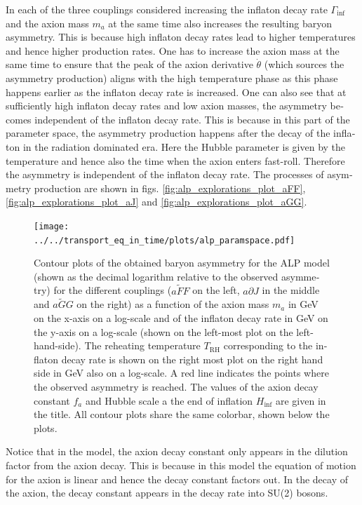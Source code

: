 \documentclass[master,       %
               twoside,        %
               BCOR10mm,       %
               english,ngerman, %
               ]{GAUBM}
\begin{document}
\begin{otherlanguage}{english}
In each of the three couplings considered increasing the inflaton decay rate $\Gamma_\mathrm{inf}$ and the axion mass $m_a$ at the same time also increases the resulting baryon asymmetry. This is because high inflaton decay rates lead to higher temperatures and hence higher production rates. One has to increase the axion mass at the same time to ensure that the peak of the axion derivative $\dot{\theta}$ (which sources the asymmetry production) aligns with the high temperature phase as this phase happens earlier as the inflaton decay rate is increased. One can also see that at sufficiently high inflaton decay rates and low axion masses, the asymmetry becomes independent of the inflaton decay rate. This is because in this part of the parameter space, the asymmetry production happens after the decay of the inflaton in the radiation dominated era. Here the Hubble parameter is given by the temperature and hence also the time when the axion enters fast-roll. Therefore the asymmetry is independent of the inflaton decay rate.
The processes of asymmetry production are shown in figs. \ref{fig:alp_explorations_plot_aFF},  \ref{fig:alp_explorations_plot_aJ} and \ref{fig:alp_explorations_plot_aGG}.
\begin{figure}[H]
    \texttt{[image: ../../transport\_eq\_in\_time/plots/alp\_paramspace.pdf]}
    \caption{Contour plots of the obtained baryon asymmetry  for the ALP model (shown as the decimal logarithm relative to the observed asymmetry) for the different couplings ($a\tilde{F}F$ on the left, $a\partial J$ in the middle and $a \tilde{G} G$ on the right) as a function of the axion mass $m_a$ in GeV on the x-axis on a log-scale and of the inflaton decay rate in GeV on the y-axis on a log-scale (shown on the left-most plot on the left-hand-side). The reheating temperature $T_\mathrm{RH}$ corresponding to the inflaton decay rate is shown on the right most plot on the right hand side in GeV also on a log-scale. A red line indicates the points where the observed asymmetry is reached. The values of the axion decay constant $f_a$ and Hubble scale a the end of inflation $H_\mathrm{inf}$ are given in the title. All contour plots share the same colorbar, shown below the plots.}
    \label{fig:alp_paramspace}
\end{figure}
Notice that in the model, the axion decay constant only appears in the dilution factor from the axion decay.
This is because in this model the equation of motion for the axion is linear and hence the decay constant factors out. In the decay of the axion, the decay constant appears in the decay rate into SU(2) bosons.

\end{otherlanguage}
\end{document}

